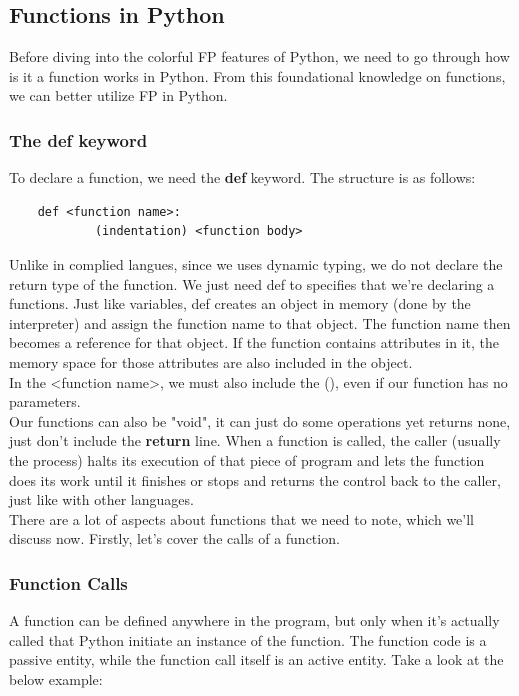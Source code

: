 \documentclass[twoside,final]{hcmut-report}
\begin{document}
\subsection{Functions in Python}
\hspace*{1mm} Before diving into the colorful FP features of Python, we need to go through how is it a function works in Python. From this foundational knowledge on functions, we can better utilize FP in Python.
\subsubsection{The def keyword}
\hspace*{1mm} To declare a function, we need the \textbf{def} keyword. The structure is as follows:
\begin{verbatim}
	def <function name>:
			(indentation) <function body>
\end{verbatim}
\hspace*{6.5mm} Unlike in complied langues, since we uses dynamic typing, we do not declare the return type of the function. We just need def to specifies that we're declaring a functions. Just like variables, def creates an object in memory (done by the interpreter) and assign the function name to that object. The function name then becomes a reference for that object. If the function contains attributes in it, the memory space for those attributes are also included in the object. \\
\hspace*{6.5mm} In the <function name>, we must also include the  (), even if our function has no parameters. \\
\hspace*{6.5mm} Our functions can also be "void", it can just do some operations yet returns none, just don't include the \textbf{return} line.  When a function is called, the caller (usually the process) halts its execution of that piece of program and lets the function does its work until it finishes or stops and returns the control back to the caller, just like with other languages.\\
\hspace*{6.5mm} There are a lot of aspects about functions that we need to note, which we'll discuss now. Firstly, let's cover the calls of a function.
\subsubsection{Function Calls}
\hspace*{1mm} A function can be defined anywhere in the program, but only when it's actually called that Python initiate an instance of the function. The function code is a passive entity, while the function call itself is an active entity. Take a look at the below example:
\end{document}
